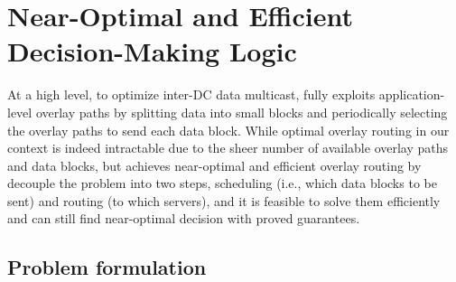 \section{Near-Optimal and Efficient Decision-Making Logic}
\label{sec:logic}


At a high level, to optimize inter-DC data multicast, \name fully
exploits application-level overlay paths by splitting data into
small blocks and periodically selecting the overlay paths to send
each data block.
While optimal overlay routing in our context is
indeed intractable due to the
sheer number of available overlay paths and data blocks, but
\name achieves near-optimal and efficient overlay routing by
decouple the problem into two steps,
scheduling (i.e., which data blocks to be sent)
and routing (to which servers), and it is feasible to solve them
efficiently and can still find
near-optimal decision with proved guarantees.



\subsection{Problem formulation}
\label{subsec:logic:formulation}

